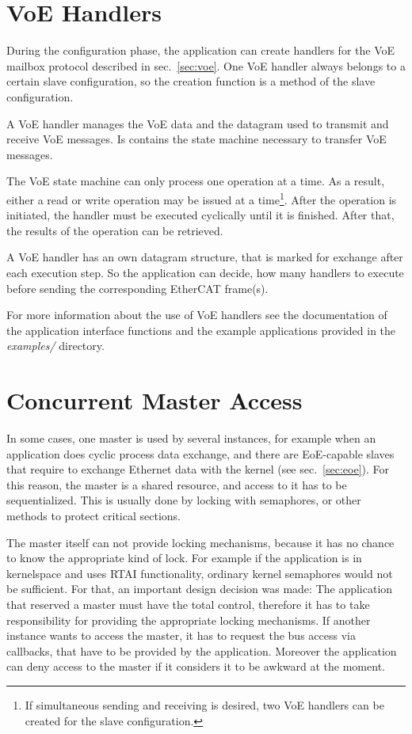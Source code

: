\documentclass[a4paper,12pt,BCOR6mm,bibtotoc,idxtotoc]{scrbook}
\begin{document}
\section{VoE Handlers}
\label{sec:api-voe}

During the configuration phase, the application can create handlers for the
VoE mailbox protocol described in sec.~\ref{sec:voe}. One VoE handler always
belongs to a certain slave configuration, so the creation function is a method
of the slave configuration.

A VoE handler manages the VoE data and the datagram used to transmit and
receive VoE messages. Is contains the state machine necessary to transfer VoE
messages.

The VoE state machine can only process one operation at a time. As a result,
either a read or write operation may be issued at a time\footnote{If
simultaneous sending and receiving is desired, two VoE handlers can be created
for the slave configuration.}. After the operation is initiated, the handler
must be executed cyclically until it is finished. After that, the results of
the operation can be retrieved.

A VoE handler has an own datagram structure, that is marked for exchange after
each execution step. So the application can decide, how many handlers to
execute before sending the corresponding EtherCAT frame(s).

For more information about the use of VoE handlers see the documentation of
the application interface functions and the example applications provided in
the \textit{examples/} directory.


\section{Concurrent Master Access}
\label{sec:concurr}

In some cases, one master is used by several instances, for example when an
application does cyclic process data exchange, and there are EoE-capable
slaves that require to exchange Ethernet data with the kernel (see
sec.~\ref{sec:eoe}). For this reason, the master is a shared resource, and
access to it has to be sequentialized. This is usually done by locking with
semaphores, or other methods to protect critical sections.

The master itself can not provide locking mechanisms, because it has no chance
to know the appropriate kind of lock. For example if the application is in
kernelspace and uses RTAI functionality, ordinary kernel semaphores would not
be sufficient. For that, an important design decision was made: The
application that reserved a master must have the total control, therefore it
has to take responsibility for providing the appropriate locking mechanisms.
If another instance wants to access the master, it has to request the bus
access via callbacks, that have to be provided by the application. Moreover
the application can deny access to the master if it considers it to be awkward
at the moment.
\end{document}
